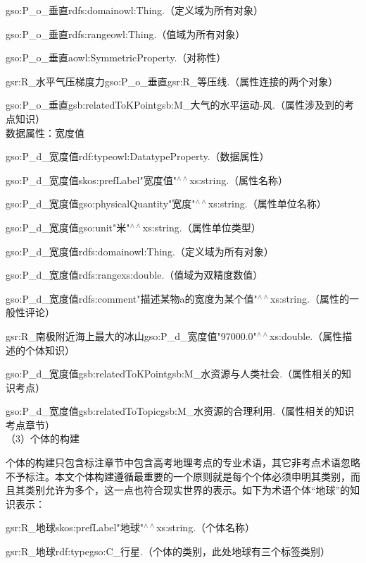 gso:P\_o\_垂直\quad rdfs:domain\quad owl:Thing\quad .\quad （定义域为所有对象）

gso:P\_o\_垂直\quad rdfs:range\quad owl:Thing\quad .\quad （值域为所有对象）

gso:P\_o\_垂直\quad a\quad owl:SymmetricProperty\quad .\quad \quad （对称性）

gsr:R\_水平气压梯度力\quad gso:P\_o\_垂直\quad gsr:R\_等压线\quad .（属性连接的两个对象）

gso:P\_o\_垂直\quad gsb:relatedToKPoint\quad gsb:M\_大气的水平运动-风\quad .（属性涉及到的考点知识）\\

数据属性：宽度值

gso:P\_d\_宽度值\quad rdf:type\quad owl:DatatypeProperty\quad .（数据属性）

gso:P\_d\_宽度值\quad skos:prefLabel\quad "宽度值"$^{\land\land}$xs:string\quad .（属性名称）

gso:P\_d\_宽度值\quad gso:physicalQuantity\quad "宽度"$^{\land\land}$xs:string\quad .（属性单位名称）

gso:P\_d\_宽度值\quad gso:unit\quad "米"$^{\land\land}$xs:string\quad .（属性单位类型）

gso:P\_d\_宽度值\quad rdfs:domain\quad owl:Thing\quad .（定义域为所有对象）

gso:P\_d\_宽度值\quad rdfs:range\quad xs:double\quad .（值域为双精度数值）

gso:P\_d\_宽度值\quad rdfs:comment\quad "描述某物a的宽度为某个值"$^{\land\land}$xs:string\quad .（属性的一般性评论）

gsr:R\_南极附近海上最大的冰山\quad gso:P\_d\_宽度值\quad \quad "97000.0"$^{\land\land}$xs:double\quad .（属性描述的个体知识）

gso:P\_d\_宽度值\quad gsb:relatedToKPoint\quad gsb:M\_水资源与人类社会\quad .（属性相关的知识考点）

gso:P\_d\_宽度值\quad gsb:relatedToTopic\quad gsb:M\_水资源的合理利用\quad .（属性相关的知识考点章节）  \\

（3）个体的构建

个体的构建只包含标注章节中包含高考地理考点的专业术语，其它非考点术语忽略不予标注。本文个体构建遵循最重要的一个原则就是每个个体必须申明其类别，而且其类别允许为多个，这一点也符合现实世界的表示。如下为术语个体“地球”的知识表示：

gsr:R\_地球\quad skos:prefLabel\quad "地球"$^{\land\land}$xs:string\quad .\quad （个体名称）

gsr:R\_地球\quad rdf:type\quad gso:C\_行星\quad .（个体的类别，此处地球有三个标签类别）

